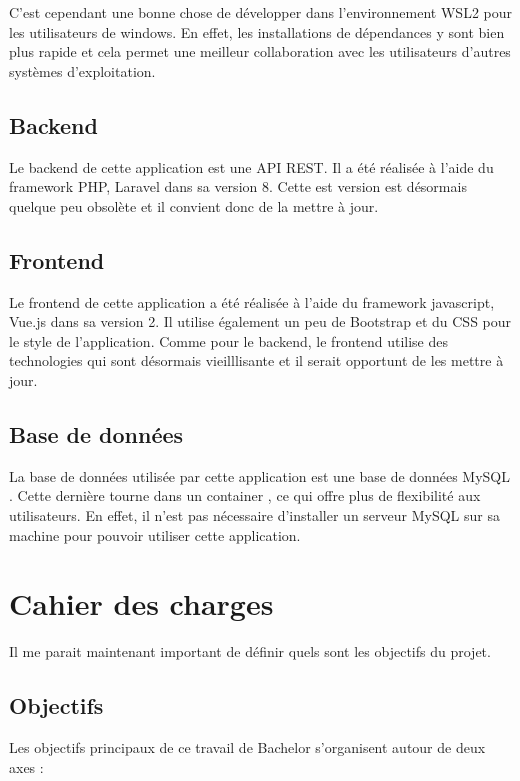 C'est cependant une bonne chose de développer dans l'environnement WSL2 pour les utilisateurs de windows. En effet, les installations de dépendances y sont bien plus rapide et cela permet une meilleur collaboration avec les utilisateurs d'autres systèmes d'exploitation.

\subsection{Backend}
Le backend de cette application est une API REST. Il a été réalisée à l'aide du framework PHP, Laravel dans sa version 8. Cette est version est désormais quelque peu obsolète et il convient donc de la mettre à jour.

\subsection{Frontend}
Le frontend de cette application a été réalisée à l'aide du framework javascript, Vue.js dans sa version 2. Il utilise également un peu de Bootstrap et du CSS pour le style de l'application. Comme pour le backend, le frontend utilise des technologies qui sont désormais vieilllisante et il serait opportunt de les mettre à jour.

\subsection{Base de données}
La base de données utilisée par cette application est une base de données MySQL \cite{MySQL}. Cette dernière tourne dans un container  \cite{Docker}, ce qui offre plus de flexibilité aux utilisateurs. En effet, il n'est pas nécessaire d'installer un serveur MySQL sur sa machine pour pouvoir utiliser cette application.

\section{Cahier des charges}
Il me parait maintenant important de définir quels sont les objectifs du projet.

\subsection{Objectifs}
Les objectifs principaux de ce travail de Bachelor s'organisent autour de deux axes :

